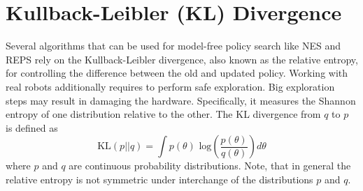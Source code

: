 \section{Kullback-Leibler (KL) Divergence}
\label{sec:kl}
Several algorithms that can be used for model-free policy search like
NES \citep{wierstra2014natural} and
REPS \citep{peters2010relative} 
rely on the Kullback-Leibler divergence, also
known as the relative entropy, for controlling
the difference between the old and updated policy.
Working with real robots additionally requires to perform safe exploration.
Big exploration steps may result in damaging the hardware.
Specifically, it measures the Shannon entropy of one distribution
relative to the other.
The KL divergence from $q$ to $p$ is defined as
$$ \text{KL}(p || q)
= \int p(\theta) \text{ log} \left(\frac{p(\theta)}{q(\theta)}\right)
d \theta $$
where $p$ and $q$ are continuous probability distributions.
Note, that in general the relative entropy is not symmetric under interchange
of the distributions $p$ and $q$.

%
%
%
%
%
%

